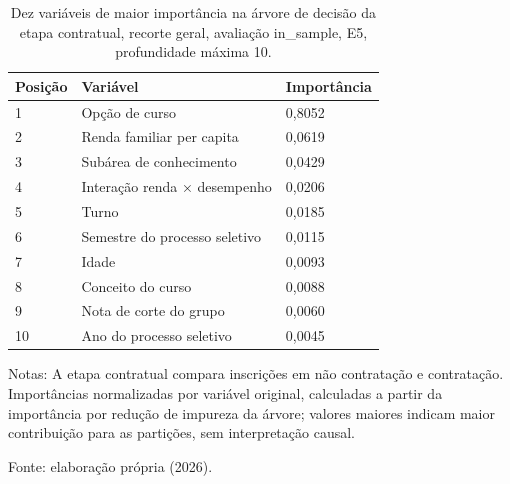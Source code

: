 \begin{table}[htbp]
\centering
\caption{Dez variáveis de maior importância na árvore de decisão da etapa contratual, recorte geral, avaliação in\_sample, E5, profundidade máxima 10.}
\label{tab:top10_importancias_treeClassification_10_binario_geral_in_sample}
\small
\begin{tabular}{lll}
\toprule
\rowcolor[gray]{0.85}
Posição & Variável & Importância \\
\midrule
1 & Opção de curso & 0,8052 \\
\rowcolor[gray]{0.95}
2 & Renda familiar per capita & 0,0619 \\
3 & Subárea de conhecimento & 0,0429 \\
\rowcolor[gray]{0.95}
4 & Interação renda × desempenho & 0,0206 \\
5 & Turno & 0,0185 \\
\rowcolor[gray]{0.95}
6 & Semestre do processo seletivo & 0,0115 \\
7 & Idade & 0,0093 \\
\rowcolor[gray]{0.95}
8 & Conceito do curso & 0,0088 \\
9 & Nota de corte do grupo & 0,0060 \\
\rowcolor[gray]{0.95}
10 & Ano do processo seletivo & 0,0045 \\
\bottomrule
\end{tabular}
\par\footnotesize{Notas: A etapa contratual compara inscrições em não contratação e contratação. Importâncias normalizadas por variável original, calculadas a partir da importância por redução de impureza da árvore; valores maiores indicam maior contribuição para as partições, sem interpretação causal.}
\par\footnotesize{Fonte: elaboração própria (2026).}
\end{table}
